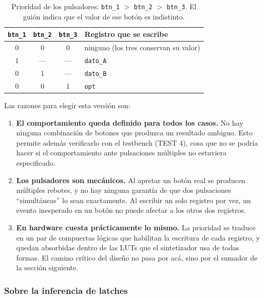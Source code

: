 \documentclass[12pt,a4paper]{article}
\begin{document}
\begin{table}[H]
  \centering
  \begin{tabular}{cccl}
    \toprule
    \texttt{btn\_1} & \texttt{btn\_2} & \texttt{btn\_3} & \textbf{Registro que se escribe} \\
    \midrule
    0 & 0 & 0 & ninguno (los tres conservan su valor) \\
    1 & --- & --- & \texttt{dato\_A} \\
    0 & 1 & --- & \texttt{dato\_B} \\
    0 & 0 & 1 & \texttt{opt} \\
    \bottomrule
  \end{tabular}
  \caption{Prioridad de los pulsadores: \texttt{btn\_1} $>$ \texttt{btn\_2} $>$
  \texttt{btn\_3}. El guión indica que el valor de ese botón es indistinto.}
  \label{tab:prioridad}
\end{table}

Las razones para elegir esta versión son:

\begin{enumerate}[leftmargin=2em,itemsep=0.25em]
  \item \textbf{El comportamiento queda definido para todos los casos.} No hay
        ninguna combinación de botones que produzca un resultado ambiguo. Esto
        permite además verificarlo con el testbench (TEST 4), cosa que no se
        podría hacer si el comportamiento ante pulsaciones múltiples no
        estuviera especificado.

  \item \textbf{Los pulsadores son mecánicos.} Al apretar un botón real se
        producen múltiples rebotes, y no hay ninguna garantía de que dos
        pulsaciones ``simultáneas'' lo sean exactamente. Al escribir un solo
        registro por vez, un evento inesperado en un botón no puede afectar a
        los otros dos registros.

  \item \textbf{En hardware cuesta prácticamente lo mismo.} La prioridad se
        traduce en un par de compuertas lógicas que habilitan la escritura de
        cada registro, y quedan absorbidas dentro de las LUTs que el
        sintetizador usa de todas formas. El camino crítico del diseño no pasa
        por acá, sino por el sumador de la sección siguiente.
\end{enumerate}

\subsubsection{Sobre la inferencia de latches}
\end{document}
